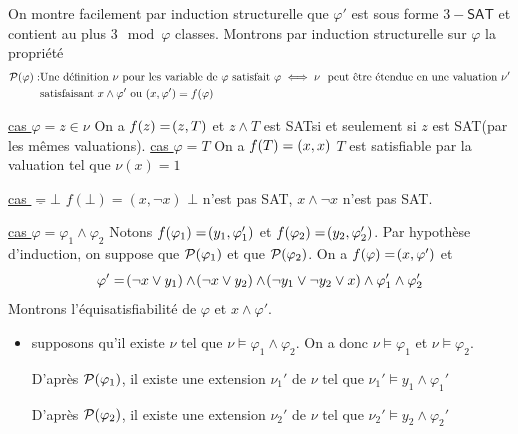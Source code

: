 \documentclass[a4paper,french,bookmarks]{book}
\newcommand{\SAT}{\textsf{SAT}}
\begin{document}
    On montre facilement par induction structurelle que $\varphi'$ est sous forme $3-\SAT$ et contient au plus $3 \mod \varphi$ classes. Montrons par induction structurelle sur $\varphi$ la propriété
    \begin{align*}
        \bcP\p{\varphi} : &\text{Une définition} \ \nu \ \text{pour les variable de} \ \varphi \ \text{satisfait} \ \varphi \iff \nu \ \text{ peut être étendue en une valuation} \ \nu'\\
        &\text{satisfaisant} \ x \land \varphi' \ou \p{x, \varphi'} = f\p{\varphi}
    \end{align*}
    \begin{enumerate}
        \itt \underline{cas $\varphi = z \in \nu$} On a $f(z) = \!\left(z, T\right)$ et $z \land T$ est \SAT si et seulement si $z$ est \SAT (par les mêmes valuations). \itt \underline{cas $\varphi = T$} On a $f\!\left(T\right) = (x, x)$ $T$ est satisfiable par la valuation tel que $\nu(x) = 1$
            
        \itt \underline{cas $\underline = \bot$} $f(\bot) = (x, \neg x)$ $\bot$ n'est pas \SAT, $x \land \neg x$ n'est pas \SAT.
            
        \itt \underline{cas $\varphi = \varphi_1 \land \varphi_2$} Notons $f\!\left(\varphi_1\right) = \!\left(y_1, \varphi_1'\right)$ et $f\!\left(\varphi_2\right) = \!\left(y_2, \varphi_2'\right)$. Par hypothèse d'induction, on suppose que $\mathcal{P}\!\left(\varphi_1\right)$ et que $\mathcal{P}\!\left(\varphi_2\right)$. On a $f\!\left(\varphi\right) = \!\left(x, \varphi'\right)$ et
        \[ \varphi' = \!\left(\neg x \lor y_1\right) \land \!\left(\neg x \lor y_2\right) \land \!\left(\neg y_1 \lor \neg y_2 \lor x\right) \land \varphi_1' \land \varphi_2'\]
        Montrons l'équisatisfiabilité de $\varphi$ et $x \land \varphi'$.
        \begin{itemize}
            \item supposons qu'il existe $\nu$ tel que $\nu \vDash \varphi_1 \land \varphi_2$. On a donc $\nu \vDash \varphi_1$ et $\nu \vDash \varphi_2$.
            
            D'après $\mathcal{P}\!\left(\varphi_1\right)$, il existe une extension $\nu_1'$ de $\nu$ tel que $\nu_1' \vDash y_1 \land \varphi_1'$
                
            D'après $\mathcal{P}\!\left(\varphi_2\right)$, il existe une extension $\nu_2'$ de $\nu$ tel que $\nu_2' \vDash y_2 \land \varphi_2'$
            

\end{itemize}
\end{enumerate}
\end{document}
